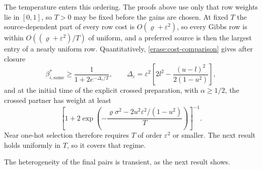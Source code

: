 The temperature enters this ordering. The proofs above use only that row weights lie in $[0,1]$, so $T>0$ may be fixed before the gains are chosen. At fixed $T$ the source-dependent part of every row cost is $O(\varrho+\varepsilon^2)$, so every Gibbs row is within $O((\varrho+\varepsilon^2)/T)$ of uniform, and a preferred source is then the largest entry of a nearly uniform row. Quantitatively, \cref{erase:cost-comparison} gives after closure
\begin{equation}
 \beta^*_{i,\mathrm{same}}\geq\frac1{1+2e^{-\Delta_\varepsilon/T}},\qquad
 \Delta_\varepsilon=\varepsilon^2\left[2l^2-\frac{(u-l)^2}{2(1-u^2)}\right],
 \label{erase:row-bound}
\end{equation}
and at the initial time of the explicit crossed preparation, with $\alpha\geq1/2$, the crossed partner has weight at least
\begin{equation}
 \left[1+2\exp\left(-\frac{\varrho\sigma^2-2u^2\varepsilon^2/(1-u^2)}{T}\right)\right]^{-1}.
 \label{erase:crossed-bound}
\end{equation}
Near one-hot selection therefore requires $T$ of order $\varepsilon^2$ or smaller. The next result holds uniformly in $T$, so it covers that regime.

The heterogeneity of the final pairs is transient, as the next result shows.

